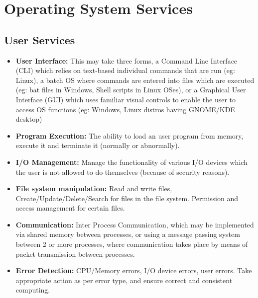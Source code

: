 \documentclass{article}
\theoremstyle{plain}
\theoremstyle{definition}
\begin{document}
\section{Operating System Services}
\subsection{User Services}
\begin{itemize}
    \item \textbf{User Interface:} This may take three forms, a Command Line Interface (CLI) which relies on text-based individual commands that are run (eg: Linux), a batch OS where commands are entered into files which are executed (eg: bat files in Windows, Shell scripts in Linux OSes), or a Graphical User Interface (GUI) which uses familiar visual controls to enable the user to access OS functions (eg: Windows, Linux distros having GNOME/KDE desktop)
    
    \item \textbf{Program Execution:} The ability to load an user program from memory, execute it and terminate it (normally or abnormally).
    
    \item \textbf{I/O Management:} Manage the functionality of various I/O devices which the user is not allowed to do themselves (because of security reasons).
    
    \item \textbf{File system manipulation:} Read and write files, Create/Update/Delete/Search for files in the file system. Permission and access management for certain files.
    
    \item \textbf{Communication:} Inter Process Communication, which may be implemented via shared memory between processes, or using a message passing system between 2 or more processes, where communication takes place by means of packet transmission between processes. 
    
    \item \textbf{Error Detection:} CPU/Memory errors, I/O device errors, user errors. Take appropriate action as per error type, and ensure correct and consistent computing. 
\end{itemize}
\end{document}
